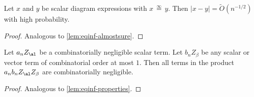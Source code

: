 \documentclass[12pt]{article}
\newcommand{\eqinf}{\,\overset{\infty}{=}\,}
\begin{document}
\begin{lemma}\label{lem:almost-sure-scalar}
    Let $x$ and $y$ be scalar diagram expressions with $x\eqinf y$. Then $|x-y| = \widetilde{O}(n^{-1/2})$ with high probability.
\end{lemma}
\begin{proof}
    Analogous to \cref{lem:eqinf-almostsure}.
\end{proof}


\begin{lemma}\label{lem:comb-neg-scalar}
    Let $a_n Z_\al$ be a combinatorially negligible scalar term.
    Let $b_n Z_\beta$ be any scalar or vector term of combinatorial order at most $1$.
    Then all terms in the product $a_n b_n Z_\al Z_\beta$ are combinatorially negligible.
\end{lemma}
\begin{proof}
    Analogous to \cref{lem:eqinf-properties}.
\end{proof}
\end{document}
